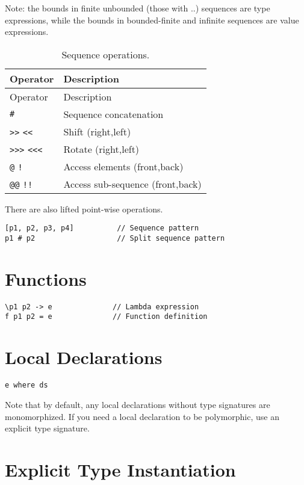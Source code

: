 Note: the bounds in finite unbounded (those with ..) sequences are type
expressions, while the bounds in bounded-finite and infinite sequences
are value expressions.

\begin{longtable}[c]{@{}ll@{}}
\caption{Sequence operations.}\tabularnewline
\toprule
Operator & Description\tabularnewline
\midrule
\endfirsthead
\toprule
Operator & Description\tabularnewline
\midrule
\endhead
\texttt{\#} & Sequence concatenation\tabularnewline
\texttt{\textgreater{}\textgreater{}} \texttt{\textless{}\textless{}} &
Shift (right,left)\tabularnewline
\texttt{\textgreater{}\textgreater{}\textgreater{}}
\texttt{\textless{}\textless{}\textless{}} & Rotate
(right,left)\tabularnewline
\texttt{@} \texttt{!} & Access elements (front,back)\tabularnewline
\texttt{@@} \texttt{!!} & Access sub-sequence
(front,back)\tabularnewline
\bottomrule
\end{longtable}

There are also lifted point-wise operations.

\begin{verbatim}
[p1, p2, p3, p4]          // Sequence pattern
p1 # p2                   // Split sequence pattern
\end{verbatim}

\section{Functions}\label{functions}

\begin{verbatim}
\p1 p2 -> e              // Lambda expression
f p1 p2 = e              // Function definition
\end{verbatim}

\section{Local Declarations}\label{local-declarations}

\begin{verbatim}
e where ds
\end{verbatim}

Note that by default, any local declarations without type signatures are
monomorphized. If you need a local declaration to be polymorphic, use an
explicit type signature.

\section{Explicit Type Instantiation}\label{explicit-type-instantiation}

